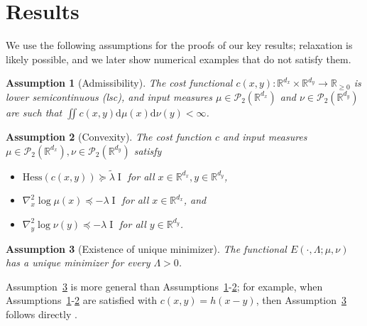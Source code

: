 \documentclass[11pt,a4paper,final]{article}
\def\P{\mathcal P}
\def\R{\mathbb R}
\DeclareMathOperator{\Id}{I}
\newcommand{\Hess}[1]{\text{Hess}\left( #1 \right)}
\renewcommand{\d}{\mathrm{d}}
\newcommand{\1}{\mathbf{1}}
\newtheorem{assumption}{Assumption}
\theoremstyle{plain}
\newtheorem{assumption}{Assumption}
\numberwithin{equation}{section}
\numberwithin{theorem}{section}
\begin{document}
\section{Results}\label{sec:results}
We use the following assumptions for the proofs of our key results; relaxation is likely possible, and we later show numerical examples that do not satisfy them.
\begin{assumption}[Admissibility]\label{assump:c_mu_nu_nice_enough}
    The cost functional $c(x,y):\R^{d_x}\times \R^{d_y}\to \R_{\ge 0}$ is lower semicontinuous (lsc),
    and input measures $\mu\in\P_2(\R^{d_x})$ and  $\nu\in\P_2(\R^{d_y})$ are such that $\iint c(x,y)\d\mu(x)\d\nu(y)<\infty$.
\end{assumption}
\begin{assumption}[Convexity]\label{assump:c_mu_nu_convex}
    The cost function $c$ and input measures $\mu\in\P_2(\R^{d_x}),\nu\in\P_2(\R^{d_y})$ satisfy
    \begin{itemize}
        \item $\Hess{c(x,y)}\succeq \tilde \lambda \Id$ for all $x\in\R^{d_x},y\in\R^{d_y}$,
        \item $\nabla^2_x \log \mu(x) \preceq -\lambda \Id$ for all $x\in\R^{d_x}$, and 
        \item $\nabla^2_y \log \nu(y) \preceq -\lambda \Id$ for all $y\in\R^{d_y}$.
    \end{itemize}
\end{assumption}
\begin{assumption}[Existence of unique minimizer]\label{assump:unique_minimizer}
    The functional $E(\cdot,\Lambda;\mu,\nu)$ has a unique minimizer for every $\Lambda>0$.
\end{assumption}
Assumption~\ref{assump:unique_minimizer} is more general than Assumptions~\ref{assump:c_mu_nu_nice_enough}-\ref{assump:c_mu_nu_convex}; for example, when Assumptions~\ref{assump:c_mu_nu_nice_enough}-\ref{assump:c_mu_nu_convex} are satisfied with $c(x,y)=h(x-y)$, then Assumption~\ref{assump:unique_minimizer} follows directly \cite[Corollary 1]{liu_approximating_2021}. 
\end{document}

